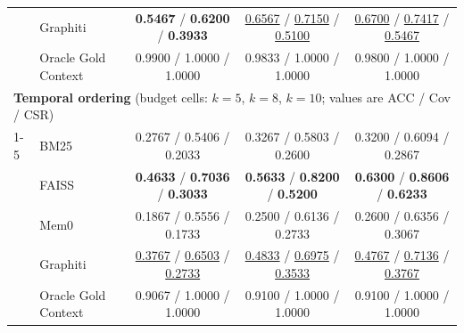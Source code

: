 \begin{table}[t]
\begin{tabular*}{\textwidth}{@{\extracolsep{\fill}}llccc@{}}
 & Graphiti & \textbf{0.5467} / \textbf{0.6200} / \textbf{0.3933} & \underline{0.6567} / \underline{0.7150} / \underline{0.5100} & \underline{0.6700} / \underline{0.7417} / \underline{0.5467} \\
 & Oracle Gold Context & 0.9900 / 1.0000 / 1.0000 & 0.9833 / 1.0000 / 1.0000 & 0.9800 / 1.0000 / 1.0000 \\
\midrule
\multicolumn{5}{l}{\textbf{Temporal ordering} (budget cells: $k=5$, $k=8$, $k=10$; values are ACC / Cov / CSR)} \\
\cmidrule(lr){1-5}
\multirow{5}{*}{Temporal} & BM25 & 0.2767 / 0.5406 / 0.2033 & 0.3267 / 0.5803 / 0.2600 & 0.3200 / 0.6094 / 0.2867 \\
 & FAISS & \textbf{0.4633} / \textbf{0.7036} / \textbf{0.3033} & \textbf{0.5633} / \textbf{0.8200} / \textbf{0.5200} & \textbf{0.6300} / \textbf{0.8606} / \textbf{0.6233} \\
 & Mem0 & 0.1867 / 0.5556 / 0.1733 & 0.2500 / 0.6136 / 0.2733 & 0.2600 / 0.6356 / 0.3067 \\
 & Graphiti & \underline{0.3767} / \underline{0.6503} / \underline{0.2733} & \underline{0.4833} / \underline{0.6975} / \underline{0.3533} & \underline{0.4767} / \underline{0.7136} / \underline{0.3767} \\
 & Oracle Gold Context & 0.9067 / 1.0000 / 1.0000 & 0.9100 / 1.0000 / 1.0000 & 0.9100 / 1.0000 / 1.0000 \\
\bottomrule
\end{tabular*}
\end{table}

